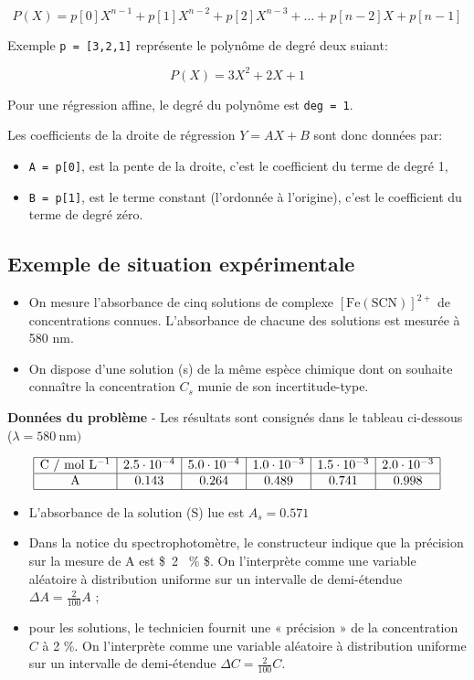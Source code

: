 \documentclass[11pt]{article}
\providecommand{\tightlist}{%
      \setlength{\itemsep}{0pt}\setlength{\parskip}{0pt}}
\begin{document}
\[P(X) = p[0]X^{n-1}+p[1]X^{n-2} + p[2] X^{n-3}+\ldots + p[n-2]X+p[n-1]\]

Exemple \texttt{p\ =\ {[}3,2,1{]}} représente le polynôme de degré deux
suiant:

\[P(X) = 3X^2 + 2X +1\]

Pour une régression affine, le degré du polynôme est \texttt{deg\ =\ 1}.

Les coefficients de la droite de régression \(Y=AX+B\) sont donc données
par:

\begin{itemize}
\item
  \texttt{A\ =\ p{[}0{]}}, est la pente de la droite, c'est le
  coefficient du terme de degré 1,
\item
  \texttt{B\ =\ p{[}1{]}}, est le terme constant (l'ordonnée à
  l'origine), c'est le coefficient du terme de degré zéro.
\end{itemize}

    \hypertarget{exemple-de-situation-expuxe9rimentale}{%
\subsection{Exemple de situation
expérimentale}\label{exemple-de-situation-expuxe9rimentale}}

\begin{itemize}
\tightlist
\item
  On mesure l'absorbance de cinq solutions de complexe
  \(\mathrm{[Fe(SCN)]^{2+}}\) de concentrations connues. L'absorbance de
  chacune des solutions est mesurée à 580 nm.
\item
  On dispose d'une solution (s) de la même espèce chimique dont on
  souhaite connaître la concentration \(C_s\) munie de son
  incertitude-type.
\end{itemize}

\textbf{Données du problème} - Les résultats sont consignés dans le
tableau ci-dessous (\(\lambda = 580 \ \mathrm{nm})\)

\[ 
\begin{array}{|c|c|c|c|c|c|}
\hline \mathrm{C \ / \ mol \ L^{-1}} & 2.5 \cdot 10^{-4} & 5.0 \cdot 10^{-4} & 1.0 \cdot 10^{-3} & 1.5 \cdot 10^{-3} & 2.0 \cdot 10^{-3}\\
\hline \mathrm{A} & 0.143 & 0.264 & 0.489 & 0.741 & 0.998 \\
\hline
\end{array}
\]

\begin{itemize}
\tightlist
\item
  L'absorbance de la solution (S) lue est \(A_s = 0.571\)
\item
  Dans la notice du spectrophotomètre, le constructeur indique que la
  précision sur la mesure de A est \$\pm ~2 ~\% \$. On l'interprète
  comme une variable aléatoire à distribution uniforme sur un intervalle
  de demi-étendue \(\Delta A = \frac{2}{100} A\) ;
\item
  pour les solutions, le technicien fournit une « précision » de la
  concentration \(C\) à 2 \%. On l'interprète comme une variable
  aléatoire à distribution uniforme sur un intervalle de demi-étendue
  \(\Delta C = \frac{2}{100} C\).
\end{itemize}
\end{document}
